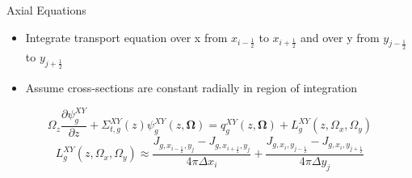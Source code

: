 \begin{frame}[t]{Axial Equations}

\begin{itemize}
  \item Integrate transport equation over x from $x_{i-\frac{1}{2}}$ to 
  $x_{i+\frac{1}{2}}$ and over y from $y_{j-\frac{1}{2}}$ to $y_{j+\frac{1}{2}}$
  \item Assume cross-sections are constant radially in region of integration
\end{itemize}
\begin{dmath*}
{\Omega_z \frac{\partial \psi_{g}^{XY}}{\partial z}} + 
{\Sigma_{t,g}^{XY}\left(z\right)\psi_{g}^{XY}\left(z,\bm\Omega\right)} = 
q_{g}^{XY}\left(z,\bm\Omega\right) + 
{L_{g}^{XY}\left(z,\Omega_x,\Omega_y\right)}
\end{dmath*}
\begin{equation*}
L_{g}^{XY}\left(z,\Omega_x,\Omega_y\right) \approx 
{\frac{J_{g,x_{i-\frac{1}{2}},y_j} - 
  J_{g,x_{i+\frac{1}{2}},y_j}}{4\pi\Delta x_i}} +
\frac{J_{g,x_i,y_{j-\frac{1}{2}}} - J_{g,x_i,y_{j+\frac{1}{2}}}}{4\pi\Delta 
y_j}
\end{equation*}

\end{frame}


